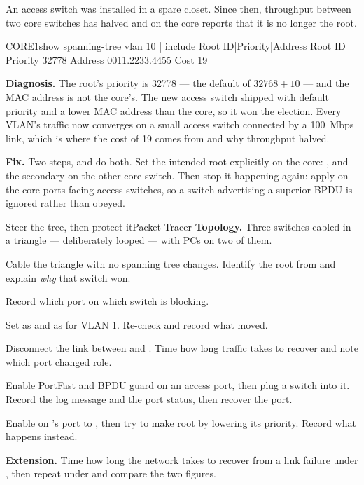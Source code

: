 \begin{breakfix}
An access switch was installed in a spare closet. Since then, throughput between
two core switches has halved and  on the core
reports that it is no longer the root.

\begin{verify}{CORE1}{show spanning-tree vlan 10 | include Root ID|Priority|Address}
  Root ID    Priority    32778
             Address     0011.2233.4455
             Cost        19
\end{verify}

\textbf{Diagnosis.} The root's priority is 32778 --- the default of $32768+10$ ---
and the MAC address is not the core's. The new access switch shipped with default
priority and a lower MAC address than the core, so it won the election. Every
VLAN's traffic now converges on a small access switch connected by a 100~Mbps
link, which is where the cost of 19 comes from and why throughput halved.

\textbf{Fix.} Two steps, and do both. Set the intended root explicitly on the
core: , and the secondary on the
other core switch. Then stop it happening again: apply
 on the core ports facing access switches, so a
switch advertising a superior BPDU is ignored rather than obeyed.
\end{breakfix}

\begin{lab}{Steer the tree, then protect it}{Packet Tracer}
\textbf{Topology.} Three switches cabled in a triangle --- deliberately looped ---
with PCs on two of them.

\begin{tasks}
  \item Cable the triangle with no spanning tree changes. Identify the root from
         and explain \emph{why} that switch won.
  \item Record which port on which switch is blocking.
  \item Set  as  and  as 
        for VLAN 1. Re-check and record what moved.
  \item Disconnect the link between  and . Time how long
        traffic takes to recover and note which port changed role.
  \item Enable PortFast and BPDU guard on an access port, then plug a switch into
        it. Record the log message and the port status, then recover the port.
  \item Enable  on 's port to ,
        then try to make  root by lowering its priority. Record what
        happens instead.
  \item \textbf{Extension.} Time how long the network takes to recover from a
        link failure under , then repeat under
         and compare the two figures.
\end{tasks}
\end{lab}

